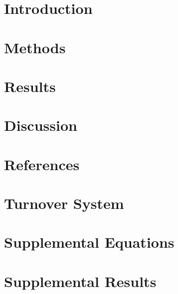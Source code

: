 \documentclass[review,3p,authoryear]{elsarticle}
\begin{document}

\section{Introduction}\label{s:intro}

\section{Methods}\label{s:methods}

\section{Results}\label{s:results}

\section{Discussion}\label{s:discussion}

\clearpage

\clearpage
\section*{References}

\clearpage
\initappendix
\section{Turnover System}\label{a:system}

\clearpage
\section{Supplemental Equations}\label{a:eqs}

\clearpage
\section{Supplemental Results}\label{a:results}

\clearpage
\end{document}
